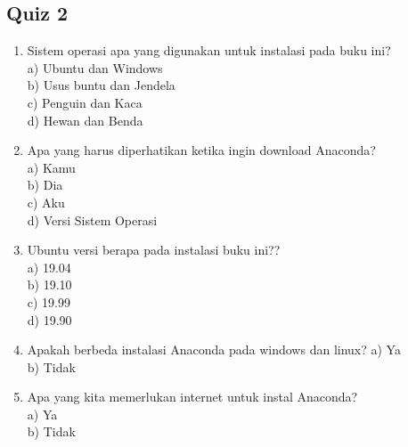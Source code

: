 \subsection{Quiz 2}
\begin{enumerate}
\item Sistem operasi apa yang digunakan untuk instalasi pada buku ini?\\
a) Ubuntu dan Windows\\
b) Usus buntu dan Jendela\\
c) Penguin dan Kaca\\
d) Hewan dan Benda

\item Apa yang harus diperhatikan ketika ingin download Anaconda?\\
a) Kamu\\
b) Dia\\
c) Aku\\
d) Versi Sistem Operasi

\item Ubuntu versi berapa pada instalasi buku ini??\\
a) 19.04\\
b) 19.10\\
c) 19.99\\
d) 19.90

\item Apakah berbeda instalasi Anaconda pada windows dan linux?
a) Ya\\
b) Tidak

\item Apa yang kita memerlukan internet untuk instal Anaconda?\\
a) Ya\\
b) Tidak
\end{enumerate}